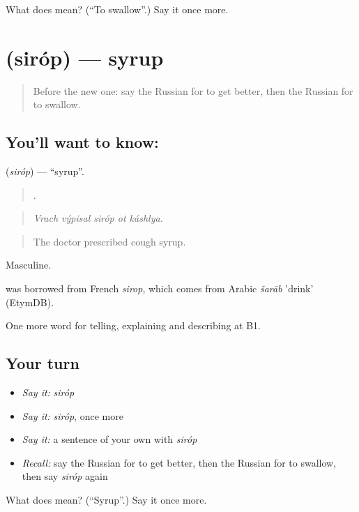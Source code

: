 \begin{tcolorbox}[breakable,colback=teal!4,colframe=teal!35!black,title={Before you move on}]
What does  mean? (\textquotedblleft{}To swallow\textquotedblright{}.) Say it once more.
\end{tcolorbox}
\section[\texorpdfstring{\ru{сироп} (siróp)}{сироп (siróp)}]{ (siróp) — syrup}

\label{lesson:RU-C490-sirop}



\begin{quote}
Before the new one: say the Russian for to get better, then the Russian for to swallow.
\end{quote}

\subsection*{You'll want to know: }
\textbf{} (\emph{siróp}) — \textquotedblleft{}syrup\textquotedblright{}.

\begin{quote}
    .
\end{quote}

\begin{quote}
\emph{Vrach výpisal siróp ot káshlya.}
\end{quote}

\begin{quote}
The doctor prescribed cough syrup.
\end{quote}

Masculine.

\begin{cousinweb}
\emph{} was borrowed from French \emph{sirop}, which comes from Arabic \emph{šarāb} 'drink' (EtymDB).
\end{cousinweb}

\begin{grammarlens}[title={What you've built}]
One more word for telling, explaining and describing at B1.
\end{grammarlens}

\subsection*{Your turn}
\begin{itemize}
\raggedright
  \item \emph{Say it:} \emph{siróp}
  \item \emph{Say it:} \emph{siróp}, once more
  \item \emph{Say it:} a sentence of your own with \emph{siróp}
  \item \emph{Recall:} say the Russian for to get better, then the Russian for to swallow, then say \emph{siróp} again
\end{itemize}

\begin{tcolorbox}[breakable,colback=teal!4,colframe=teal!35!black,title={Before you move on}]
What does  mean? (\textquotedblleft{}Syrup\textquotedblright{}.) Say it once more.
\end{tcolorbox}
